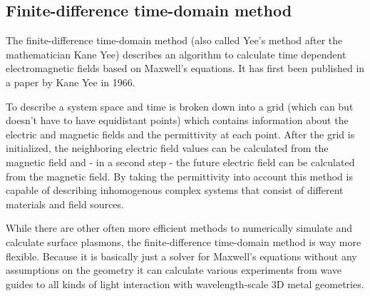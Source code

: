 \subsection{Finite-difference time-domain method}

The finite-difference time-domain method (also called Yee's method after the mathematician Kane Yee) describes an algorithm to calculate time dependent electromagnetic fields based on Maxwell's equations. It has first been published in a paper by Kane Yee in 1966\cite{yee}.

To describe a system space and time is broken down into a grid (which can but doesn't have to have equidistant points) which contains information about the electric and magnetic fields and the permittivity at each point. After the grid is initialized, the neighboring electric field values can be calculated from the magnetic field and - in a second step - the future electric field can be calculated from the magnetic field. By taking the permittivity into account this method is capable of describing inhomogenous complex systems that consist of different materials and field sources.

While there are other often more efficient methods to numerically simulate and calculate surface plasmons, the finite-difference time-domain method is way more flexible. Because it is basically just a solver for Maxwell's equations without any assumptions on the geometry it can calculate various experiments from wave guides to all kinds of light interaction with wavelength-scale 3D metal geometries\mcite.
